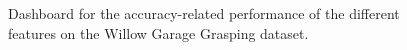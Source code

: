 \begin{figure}[thpb]
  \caption{Dashboard for the accuracy-related performance of the different features on the Willow Garage Grasping dataset.}
  \label{fig:WGDB_dashboard}
\end{figure}
